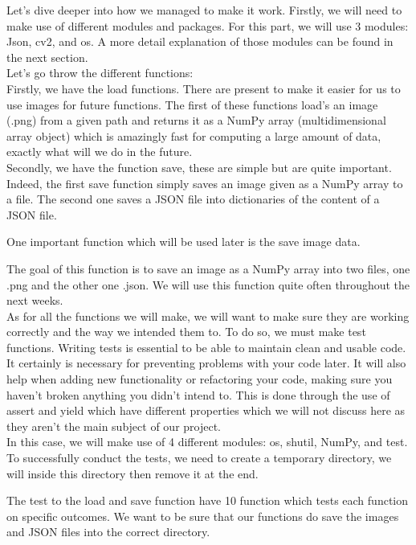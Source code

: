 \documentclass[12pt]{article}
\begin{document}
Let’s dive deeper into how we managed to make it work. Firstly, we will need to make use of different modules and packages. For this part, we will use 3 modules: Json, cv2, and os. A more detail explanation of those modules can be found in the next section.\\ 

 
Let’s go throw the different functions: \\ 

Firstly, we have the load functions. There are present to make it easier for us to use images for future functions. The first of these functions load’s an image (.png) from a given path and returns it as a NumPy array (multidimensional array object) which is amazingly fast for computing a large amount of data, exactly what will we do in the future.\\ 

Secondly, we have the function save, these are simple but are quite important. Indeed, the first save function simply saves an image given as a NumPy array to a file. The second one saves a JSON file into dictionaries of the content of a JSON file. 

One important function which will be used later is the save image data. 

The goal of this function is to save an image as a NumPy array into two files, one .png and the other one .json. We will use this function quite often throughout the next weeks.\\ 

As for all the functions we will make, we will want to make sure they are working correctly and the way we intended them to. To do so, we must make test functions. Writing tests is essential to be able to maintain clean and usable code. It certainly is necessary for preventing problems with your code later. It will also help when adding new functionality or refactoring your code, making sure you haven’t broken anything you didn’t intend to. This is done through the use of assert and yield which have different properties which we will not discuss here as they aren’t the main subject of our project.\\ 

In this case, we will make use of 4 different modules: os, shutil, NumPy, and test. To successfully conduct the tests, we need to create a temporary directory, we will inside this directory then remove it at the end.  

The test to the load and save function have 10 function which tests each function on specific outcomes. We want to be sure that our functions do save the images and JSON files into the correct directory.  
\end{document}
